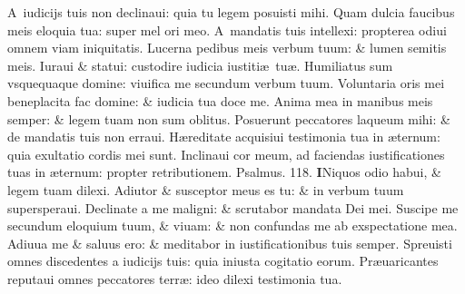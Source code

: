 \documentclass[a5paper,10pt]{book}
\def\ae{æ}
\begin{document}
\begin{multicols*}{2}
\newline \color{red} A\color{black}\ iudicijs tuis non declinaui: quia tu legem posuisti mihi.
\newline \color{red} Q\color{black}uam dulcia faucibus meis eloquia tua: super mel ori meo.
\newline \color{red} A\color{black}\ mandatis tuis intellexi: propterea odiui omnem viam iniquitatis.
\newline \color{red} L\color{black}ucerna pedibus meis verbum tuum: \& lumen semitis meis.
\newline \color{red} I\color{black}uraui \& statui: custodire iudicia iustiti\ae \ tu\ae .
\newline \color{red} H\color{black}umiliatus sum vsquequaque domine: viuifica me secundum verbum tuum.
\newline \color{red} V\color{black}oluntaria oris mei beneplacita fac domine: \& iudicia tua doce me.
\newline \color{red} A\color{black}nima mea in manibus meis semper: \& legem tuam non sum oblitus.
\newline \color{red} P\color{black}osuerunt peccatores laqueum mihi: \& de mandatis tuis non erraui.
\newline \color{red} H\color{black}\ae reditate acquisiui testimonia tua in \ae ternum: quia exultatio cordis mei sunt.
\newline \color{red} I\color{black}nclinaui cor meum, ad faciendas iustificationes tuas in \ae ternum: propter retributionem. \quad \color{red} Psalmus. 118. \color{black}
\vspace{-.5em}
\lettrine[lines=2]{\bfseries \color{red} I}{}Niquos odio habui, \& legem tuam dilexi.
\newline \color{red} A\color{black}diutor \& susceptor meus es tu: \& in verbum tuum supersperaui.
\newline \color{red} D\color{black}eclinate a me maligni: \& scrutabor mandata Dei mei.
\newline \color{red} S\color{black}uscipe me secundum eloquium  tuum, \& viuam: \& non confundas me ab exspectatione mea.
\newline \color{red} A\color{black}diuua me \& saluus ero: \& meditabor in iustificationibus tuis semper.
\newline \color{red} S\color{black}preuisti omnes discedentes a iudicijs tuis: quia iniusta cogitatio eorum.
\newline \color{red} P\color{black}r\ae uaricantes reputaui omnes peccatores terr\ae : ideo dilexi testimonia tua.

\end{multicols*}
\end{document}
